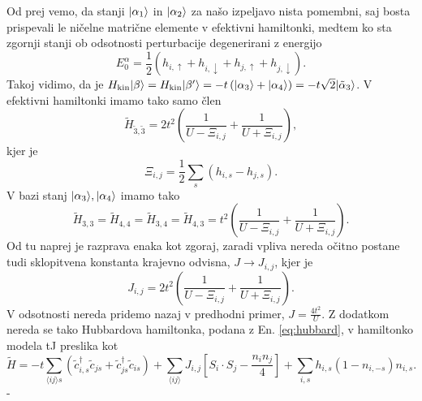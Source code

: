 \documentclass[10pt,a4paper]{article}
\begin{document}
Od prej vemo, da stanji $\vert\alpha_1\rangle$ in $\vert\alpha_2\rangle$ za našo izpeljavo nista pomembni, saj bosta prispevali le ničelne matrične elemente v efektivni hamiltonki, medtem ko sta zgornji stanji ob odsotnosti perturbacije degenerirani z energijo $$E_0^\alpha= \frac{1}{2} \left(h_{i,\uparrow} + h_{i,\downarrow} + h_{j,\uparrow} + h_{j,\downarrow}\right).$$ Takoj vidimo, da je 
$H_\mathrm{kin}\vert\beta\rangle= H_\mathrm{kin}\vert\beta'\rangle=-t\left(\vert\alpha_3\rangle+\vert\alpha_4\rangle\right)=-t\sqrt{2} \vert\tilde{\alpha}_3\rangle$. V efektivni hamiltonki imamo tako samo člen 
$$\tilde{H}_{\tilde{3},\tilde{3}}=2t^2\left(\frac{1}{U - \Xi_{i,j}} + \frac{1}{ U + \Xi_{i,j}}\right), $$
kjer je 
$$\Xi_{i,j}=\frac{1}{2}\sum\limits_s \left(h_{i,s} - h_{j,s}\right).$$
V bazi stanj $\vert\alpha_3\rangle, \vert\alpha_4\rangle$ imamo tako 
$$
\tilde{H}_{3,3}=\tilde{H}_{4,4}=\tilde{H}_{3,4}=\tilde{H}_{4,3}=t^2\left( \frac{1}{U - \Xi_{i,j}} + \frac{1}{U + \Xi_{i,j}}\right).
$$
Od tu naprej je razprava enaka kot zgoraj, zaradi vpliva nereda očitno postane tudi sklopitvena konstanta krajevno odvisna, $J\rightarrow J_{i,j}$, kjer je 
\begin{equation}
J_{i,j}=2t^2 \left( \frac{1}{U-\Xi_{i,j}} + \frac{1}{U+ \Xi_{i,j}}\right).
\end{equation}
V odsotnosti nereda pridemo nazaj v predhodni primer, $J=\frac{4t^2}{U}$. Z dodatkom nereda se tako Hubbardova hamiltonka, podana z En. \eqref{eq:hubbard}, v hamiltonko modela tJ preslika kot 
\begin{equation}
\tilde{H}=-t\sum\limits_{\langle ij \rangle s} \left(\tilde{c}^\dagger_{i,s} \tilde{c}_{js} + \tilde{c}^\dagger_{js}\tilde{c}_{is}\right) +\sum\limits_{\langle ij \rangle} J_{i,j}\left[ S_i\cdot  S_j - \frac{n_i n_j}{4}\right] +\sum\limits_{i,s} h_{i,s} \left(1-n_{i,-s}\right)n_{i,s}.
\end{equation}-
\end{document}
